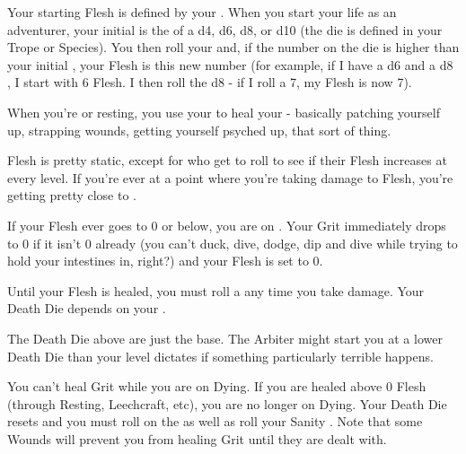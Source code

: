 {Your starting Flesh is defined by your \FLESH.  When you start your life as an adventurer, your initial \FLESH is the \MAX of a d4, d6, d8, or d10 (the die is defined in your Trope or Species). You then roll your \VIG and, if the number on the die is higher than your initial \FLESH, your \MAX Flesh is this new number (for example, if I have a d6 \FLESH and a d8 \VIG, I start with 6 Flesh.  I then roll the d8 - if I roll a 7, my \MAX Flesh is now 7).

When you're  or resting, you use your \FLESH to heal your  - basically patching yourself up, strapping wounds, getting yourself psyched up, that sort of thing.  

Flesh is pretty static, except for  who get to roll to see if their Flesh increases at every level.  If you're ever at a point where you're taking damage to Flesh, you're getting pretty close to .



  If your Flesh ever goes to 0 or below, you are on  .  Your Grit immediately drops to 0 if it isn't 0 already (you can't duck, dive, dodge, dip and dive while trying to hold your intestines in, right?) and your Flesh is set to 0.

  Until your Flesh is healed, you must roll a \DEATH any time you take damage.  Your Death Die depends on your \LVL.


  The Death Die above are just the base. The Arbiter might start you at a lower Death Die than your level dictates if something particularly terrible happens. 

  You can't heal Grit while you are on Dying.  If you are healed above 0 Flesh (through Resting, Leechcraft, etc), you are no longer on Dying.  Your Death Die resets and you must roll on the  as well as roll your Sanity \UD.  Note that some Wounds will prevent you from healing Grit until they are dealt with.


}
